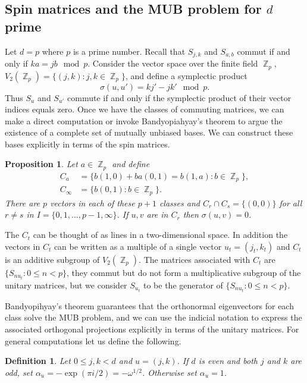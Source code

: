 \documentclass[a4paper]{article}
\DeclareMathOperator{\Z}{\mathbb{Z}}
\newtheorem{definition}{Definition}
\newtheorem{proposition}{Proposition}
\begin{document}
  \subsection{Spin matrices and the MUB problem for $d$ 
  prime}

  Let $d = p$ where $p$ is a prime number. Recall that
  $S_{j,k}$ and $S_{a,b}$ commut if and only if $ka = jb
  \mod p$. Consider the vector space over the finite field
  $\Z_p$, $V_2(\Z_p) = \{(j,k) : j,k \in \Z_p\}$, and define
  a symplectic product
  \[
    \sigma(u, u')
    = kj' - jk' \mod p.
  \] 
  Thus $S_u$ and $S_{u'}$ commute if and only if the
  symplectic product of their vector indices equals zero.
  Once we have the classes of commuting matrices, we can
  make a direct computation or invoke Bandyopiahyay's
  theorem to argue the existence of a complete set of
  mutually unbiased bases. We can construct these bases
  explicitly in terms of the spin matrices.

  \begin{proposition}
    Let $a \in \Z_p$ and define
    \begin{align*}
      C_a &= \{b(1,0) + ba(0,1) = b(1,a) : b \in \Z_p\},\\
      C_\infty &= \{b(0,1) : b \in \Z_p\}
    .\end{align*}
    There are $p$ vectors in each of these $p+1$ classes and
    $C_r \cap C_s = \{(0,0)\}$ for all $r \neq s$ in $I =
    \{0,1,\ldots,p-1,\infty\}$. If $u,v$ are in $C_r$ then
    $\sigma(u,v) = 0$.
  \end{proposition}

  The $C_t$ can be thought of as lines in a two-dimensional
  space. In addition the vectors in $C_t$ can be written as
  a multiple of a single vector $u_t = (j_t,k_t)$ and $C_t$ 
  is an additive subgroup of $V_2(\Z_p)$. The matrices
  associated with $C_t$ are $\{S_{nu_t} : 0 \leq n < p\}$,
  they commut but do not form a multiplicative subgroup of
  the unitary matrices, but we consider $S_{u_t}$ to be the
  generator of $\{S_{nu_t} : 0 \leq n < p\}$.

  Bandyopihyay's theorem guarantees that the orthonormal
  eigenvectors for each class solve the MUB problem, and we
  can use the indicial notation to express the associated
  orthogonal projections explicitly in terms of the unitary
  matrices. For general computations let us define the
  following.

  \begin{definition}
    Let $0 \leq j,k < d$ and $u = (j,k)$. If $d$ is even and
    both $j$ and $k$ are odd, set $\alpha_u = -\exp(\pi i /
    2) = -\omega^{1 / 2}$. Otherwise set $\alpha_u = 1$.
  \end{definition}
\end{document}
